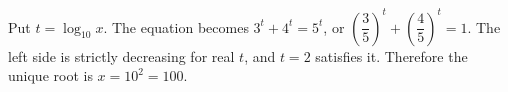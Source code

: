 Put $t=\log_{10}x$. The equation becomes $3^t+4^t=5^t$, or $(\dfrac{3}{5})^t+(\dfrac{4}{5})^t=1$. The left side is strictly decreasing for real $t$, and $t=2$ satisfies it. Therefore the unique root is $x=10^2=\boxed{100}$.
